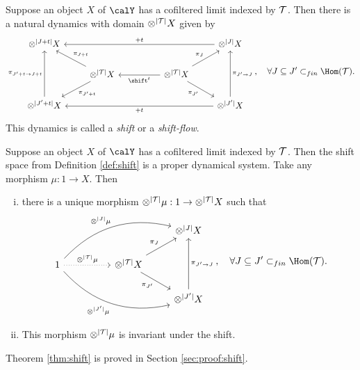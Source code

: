 \documentclass[12pt,oneside,pb-diagram]{article}
\begin{document}
\begin{definition}  \label{def:shift}
	Suppose an object $X$ of $\calY$ has a cofiltered limit indexed by $\mathcal{T}$. Then there is a natural dynamics with domain $\otimes^{|\mathcal{T}|} X$ given by 
	\begin{equation} \label{eqn:def:shift}
		\begin{tikzcd}
			\otimes^{|J+t|} X & & & & \otimes^{|J|} X \arrow[llll, "+t"'] \\
			& \otimes^{|\Time|} X \arrow[ld, "\pi_{J'+t}"] \arrow[lu, "\pi_{J+t}"'] & & \otimes^{|\Time|} X \arrow[ll, "\shift^t"] \arrow[rd, "\pi_{J'}"'] \arrow[ru, "\pi_J"]  & \\
			\otimes^{|J'+t|} X \arrow[uu, "\pi_{J'+t \to J+t}"] & & & & \otimes^{|J'|} X \arrow[uu, "\pi_{J'\to J}"'] \arrow[llll, "+t"]
		\end{tikzcd} ,
		\quad \forall J\subseteq J' \subset_{fin} \Hom(\Time).
	\end{equation}
	This dynamics is called a \emph{shift} or a \emph{shift-flow}.
\end{definition} 

\begin{theorem}  \label{thm:shift}
	Suppose an object $X$ of $\calY$ has a cofiltered limit indexed by $\mathcal{T}$. Then the shift space from Definition \ref{def:shift} is a proper dynamical system. Take any morphism $\mu : 1\to X$. Then 
	\begin{enumerate} [(i)]
		\item there is a unique morphism $\otimes^{|\mathcal{T}|} \mu : 1 \to \otimes^{|\mathcal{T}|} X$ such that
		\[\begin{tikzcd}
			& & & \otimes^{|J|} X \\
			1 \arrow[rrru, "\otimes^{|J|} \mu", bend left] \arrow[rrrd, "\otimes^{|J'|} \mu"', bend right] \arrow[rr, "\otimes^{|\Time|} \mu", dotted] & & \otimes^{|\Time|} X \arrow[rd, "\pi_{J'}"'] \arrow[ru, "\pi_J"] & \\
			& & & \otimes^{|J'|} X \arrow[uu, "\pi_{J'\to J}"']
		\end{tikzcd},
		\quad \forall J\subseteq J' \subset_{fin} \Hom(\Time).\]
		\item This morphism $\otimes^{|\mathcal{T}|} \mu$ is invariant under the shift.
	\end{enumerate}
\end{theorem}

Theorem \ref{thm:shift} is proved in Section \ref{sec:proof:shift}.
\end{document}

